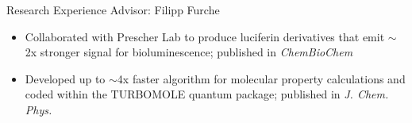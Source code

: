\begin{rubric}{Research Experience}
  Advisor: Filipp Furche
  \vspace{-0.5em}
  \begin{itemize}
  \itemsep-0.5em
  \item Collaborated with Prescher Lab to produce luciferin derivatives that emit
    $\sim$2x stronger signal for bioluminescence; published in \textit{ChemBioChem}
  \item Developed up to $\sim$4x faster algorithm for molecular property calculations and coded
    within the TURBOMOLE quantum package; published in \textit{J. Chem. Phys.}
  \end{itemize}
\end{rubric}
